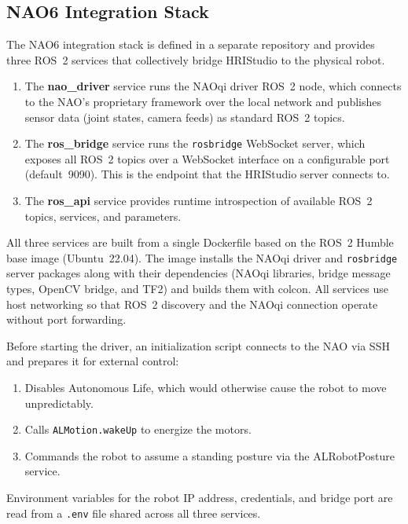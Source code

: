 \subsection{NAO6 Integration Stack}
\label{sec:nao6-integration}

The NAO6 integration stack is defined in a separate repository and provides three ROS~2 services that collectively bridge HRIStudio to the physical robot.

\begin{enumerate}
\item The \textbf{nao\_driver} service runs the NAOqi driver ROS~2 node, which connects to the NAO's proprietary framework over the local network and publishes sensor data (joint states, camera feeds) as standard ROS~2 topics.
\item The \textbf{ros\_bridge} service runs the \texttt{rosbridge} WebSocket server, which exposes all ROS~2 topics over a WebSocket interface on a configurable port (default~9090). This is the endpoint that the HRIStudio server connects to.
\item The \textbf{ros\_api} service provides runtime introspection of available ROS~2 topics, services, and parameters.
\end{enumerate}

All three services are built from a single Dockerfile based on the ROS~2 Humble base image (Ubuntu~22.04). The image installs the NAOqi driver and \texttt{rosbridge} server packages along with their dependencies (NAOqi libraries, bridge message types, OpenCV bridge, and TF2) and builds them with colcon. All services use host networking so that ROS~2 discovery and the NAOqi connection operate without port forwarding.

Before starting the driver, an initialization script connects to the NAO via SSH and prepares it for external control:

\begin{enumerate}
\item Disables Autonomous Life, which would otherwise cause the robot to move unpredictably.
\item Calls \texttt{ALMotion.wakeUp} to energize the motors.
\item Commands the robot to assume a standing posture via the ALRobotPosture service.
\end{enumerate}

Environment variables for the robot IP address, credentials, and bridge port are read from a \texttt{.env} file shared across all three services.

